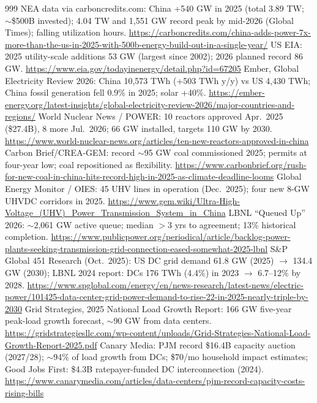 \begin{thebibliography}{999}
 NEA data via carboncredits.com: China +540 GW in 2025 (total 3.89 TW; $\sim$\$500B invested); 4.04 TW and 1,551 GW record peak by mid-2026 (Global Times); falling utilization hours. \url{https://carboncredits.com/china-adds-power-7x-more-than-the-us-in-2025-with-500b-energy-build-out-in-a-single-year/}
 US EIA: 2025 utility-scale additions 53 GW (largest since 2002); 2026 planned record 86 GW. \url{https://www.eia.gov/todayinenergy/detail.php?id=67205}
 Ember, Global Electricity Review 2026: China 10,573 TWh (+503 TWh y/y) vs US 4,430 TWh; China fossil generation fell 0.9\% in 2025; solar +40\%. \url{https://ember-energy.org/latest-insights/global-electricity-review-2026/major-countries-and-regions/}
 World Nuclear News / POWER: 10 reactors approved Apr.\ 2025 (\$27.4B), 8 more Jul.\ 2026; 66 GW installed, targets 110 GW by 2030. \url{https://www.world-nuclear-news.org/articles/ten-new-reactors-approved-in-china}
 Carbon Brief/CREA-GEM: record $\sim$95 GW coal commissioned 2025; permits at four-year low; coal repositioned as flexibility. \url{https://www.carbonbrief.org/rush-for-new-coal-in-china-hits-record-high-in-2025-as-climate-deadline-looms}
 Global Energy Monitor / OIES: 45 UHV lines in operation (Dec.\ 2025); four new 8-GW UHVDC corridors in 2025. \url{https://www.gem.wiki/Ultra-High-Voltage_(UHV)_Power_Transmission_System_in_China}
 LBNL ``Queued Up'' 2026: $\sim$2,061 GW active queue; median $>$3 yrs to agreement; 13\% historical completion. \url{https://www.publicpower.org/periodical/article/backlog-power-plants-seeking-transmission-grid-connection-eased-somewhat-2025-lbnl}
 S\&P Global 451 Research (Oct.\ 2025): US DC grid demand 61.8 GW (2025) $\rightarrow$ 134.4 GW (2030); LBNL 2024 report: DCs 176 TWh (4.4\%) in 2023 $\rightarrow$ 6.7--12\% by 2028. \url{https://www.spglobal.com/energy/en/news-research/latest-news/electric-power/101425-data-center-grid-power-demand-to-rise-22-in-2025-nearly-triple-by-2030}
 Grid Strategies, 2025 National Load Growth Report: 166 GW five-year peak-load growth forecast, $\sim$90 GW from data centers. \url{https://gridstrategiesllc.com/wp-content/uploads/Grid-Strategies-National-Load-Growth-Report-2025.pdf}
 Canary Media: PJM record \$16.4B capacity auction (2027/28); $\sim$94\% of load growth from DCs; \$70/mo household impact estimates; Good Jobs First: \$4.3B ratepayer-funded DC interconnection (2024). \url{https://www.canarymedia.com/articles/data-centers/pjm-record-capacity-costs-rising-bills}

\end{thebibliography}
